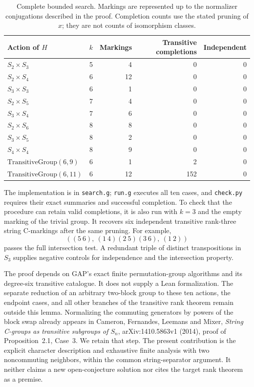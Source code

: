 \begin{table}[ht]
\centering
\begin{tabular}{lrrrr}
\toprule
Action of $H$ & $k$ & Markings & Transitive completions & Independent\\
\midrule
$S_2\times S_3$ &5&4&0&0\\
$S_2\times S_4$ &6&12&0&0\\
$S_3\times S_3$ &6&1&0&0\\
$S_2\times S_5$ &7&4&0&0\\
$S_3\times S_4$ &7&6&0&0\\
$S_2\times S_6$ &8&8&0&0\\
$S_3\times S_5$ &8&2&0&0\\
$S_4\times S_4$ &8&9&0&0\\
$\mathrm{TransitiveGroup}(6,9)$ &6&1&2&0\\
$\mathrm{TransitiveGroup}(6,11)$ &6&12&152&0\\
\bottomrule
\end{tabular}
\caption{Complete bounded search. Markings are represented up to the
normalizer conjugations described in the proof. Completion counts
use the stated pruning of $x$; they are not counts of isomorphism classes.}
\end{table}

The implementation is in \texttt{search.g}; \texttt{run.g} executes
all ten cases, and \texttt{check.py} requires their exact summaries
and successful completion. To check that the procedure can retain
valid completions, it is also run with $k=3$ and the empty marking
of the trivial group. It recovers six independent transitive
rank-three string C-markings after the same pruning. For example,
\[
       ((5\ 6),\ (1\ 4)(2\ 5)(3\ 6),\ (1\ 2))
\]
passes the full intersection test. A redundant triple of distinct
transpositions in $S_3$ supplies negative controls for independence
and the intersection property.

The proof depends on GAP's exact finite permutation-group algorithms
and its degree-six transitive catalogue. It does not supply a Lean
formalization. The separate reduction of an arbitrary two-block
group to these ten actions, the endpoint cases, and all other
branches of the transitive rank theorem remain outside this lemma.
Normalizing the commuting generators by powers of the block swap
already appears in Cameron, Fernandes, Leemans and Mixer,
\emph{String C-groups as transitive subgroups of $S_n$},
arXiv:1410.5863v1 (2014), proof of Proposition~2.1, Case~3.
We retain that step. The present contribution is the explicit
character description and exhaustive finite analysis with two
noncommuting neighbors, within the common string-separator argument.
It neither claims a new open-conjecture solution nor cites the
target rank theorem as a premise.
